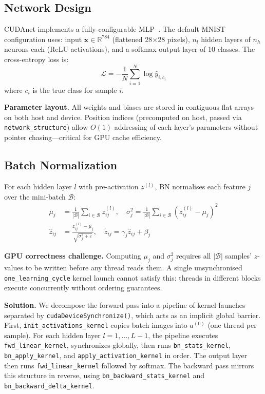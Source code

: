 \documentclass[runningheads]{llncs}
\begin{document}
\subsection{Network Design}

CUDAnet implements a fully-configurable MLP~\cite{b3}. The default MNIST
configuration uses: input $\mathbf{x} \in \mathbb{R}^{784}$ (flattened
28$\times$28 pixels), $n_l$ hidden layers of $n_h$ neurons each (ReLU
activations), and a softmax output layer of 10 classes. The cross-entropy
loss is:
\begin{equation}
  \mathcal{L} = -\frac{1}{N} \sum_{i=1}^{N} \log \hat{y}_{i,c_i}
\end{equation}
where $c_i$ is the true class for sample $i$.

\textbf{Parameter layout.} All weights and biases are stored in contiguous
flat arrays on both host and device. Position indices (precomputed on
host, passed via \texttt{network\_structure}) allow $O(1)$ addressing of
each layer's parameters without pointer chasing—critical for GPU cache
efficiency.

\subsection{Batch Normalization}

For each hidden layer $l$ with pre-activation $z^{(l)}$, BN normalises
each feature $j$ over the mini-batch $\mathcal{B}$:
\begin{align}
  \mu_j      &= \frac{1}{|\mathcal{B}|}\sum_{i \in \mathcal{B}} z_{ij}^{(l)},
  \quad
  \sigma_j^2  = \frac{1}{|\mathcal{B}|}\sum_{i \in \mathcal{B}}
                (z_{ij}^{(l)} - \mu_j)^2 \\
  \hat{z}_{ij} &= \frac{z_{ij}^{(l)} - \mu_j}{\sqrt{\sigma_j^2 + \varepsilon}},
  \quad
  \tilde{z}_{ij} = \gamma_j \hat{z}_{ij} + \beta_j
\end{align}

\textbf{GPU correctness challenge.} Computing $\mu_j$ and $\sigma_j^2$
requires all $|\mathcal{B}|$ samples' $z$-values to be written before any
thread reads them. A single unsynchronised \texttt{one\_learning\_cycle}
kernel launch cannot satisfy this: threads in different blocks execute
concurrently without ordering guarantees.

\textbf{Solution.} We decompose the forward pass into a pipeline of kernel
launches separated by \mbox{\texttt{cudaDeviceSynchronize()}}, which acts
as an implicit global barrier. First,
\mbox{\texttt{init\_activations\_kernel}} copies batch images into
$a^{(0)}$ (one thread per sample). For each hidden layer
$l=1,\ldots,L{-}1$, the pipeline executes
\mbox{\texttt{fwd\_linear\_kernel}}, synchronizes globally, then runs
\mbox{\texttt{bn\_stats\_kernel}}, \mbox{\texttt{bn\_apply\_kernel}}, and
\mbox{\texttt{apply\_activation\_kernel}} in order. The output layer then
runs \mbox{\texttt{fwd\_linear\_kernel}} followed by softmax. The backward
pass mirrors this structure in reverse, using
\mbox{\texttt{bn\_backward\_stats\_kernel}} and
\mbox{\texttt{bn\_backward\_delta\_kernel}}.
\end{document}

